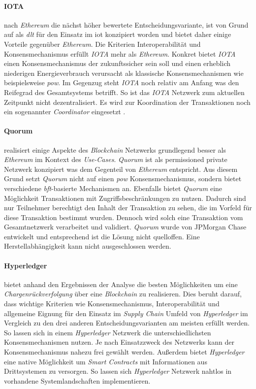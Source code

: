 \paragraph{IOTA} nach \textit{Ethereum} die nächst höher bewertete Entscheidungsvariante, ist von Grund auf als \textit{\ac{dlt}} für den Einsatz im \acf{iot} konzipiert worden und bietet daher einige Vorteile gegenüber \textit{Ethereum}. Die Kriterien Interoperabilität und Konsensmechanismus erfüllt \textit{IOTA} mehr als \textit{Ethereum}. Konkret bietet \textit{IOTA} einen Konsensmechanismus der zukunftssicher sein soll und einen erheblich niederigen Energieverbrauch verursacht als klassische Konsensmechanismen wie beispielsweise \textit{\ac{pow}}. Im Gegenzug steht \textit{IOTA} noch relativ am Anfang was den Reifegrad des Gesamtsystems betrifft. So ist das \textit{IOTA} Netzwerk zum aktuellen Zeitpunkt nicht dezentralisiert. Es wird zur Koordination der Transaktionen noch ein sogenannter \textit{Coordinator} eingesetzt \citep{Schiener2017}.

\paragraph{Quorum} realisiert einige Aspekte des \textit{Blockchain} Netzwerks grundlegend besser als \textit{Ethereum} im Kontext des \textit{Use-Cases}. \textit{Quorum} ist als permissioned private Netzwerk konzipiert was dem Gegenteil von \textit{Ethereum} entspricht. Aus diesem Grund setzt \textit{Quorum} nicht auf einen \textit{\ac{pow}} Konsensmechanismus, sondern bietet verschiedene \textit{\ac{bft}}-basierte Mechanismen an. Ebenfalls bietet \textit{Quorum} eine Möglichkeit Transaktionen mit Zugriffsbeschränkungen zu nutzen. Dadurch sind nur Teilnehmer berechtigt den Inhalt der Transaktion zu sehen, die im Vorfeld für diese Transaktion bestimmt wurden. Dennoch wird solch eine Transaktion vom Gesamtnetzwerk verarbeitet und validiert. \textit{Quorum} wurde von JPMorgan Chase entwickelt und entsprechend ist die Lösung nicht quelloffen. Eine Herstellabhängigkeit kann nicht ausgeschlossen werden.

\paragraph{Hyperledger} bietet anhand den Ergebnissen der Analyse die besten Möglichkeiten um eine \textit{Chargenrückverfolgung} über eine \textit{Blockchain} zu realisieren. Dies beruht darauf, dass wichtige Kriterien wie Konsensmechanismus, Interoperabilität und allgemeine Eignung für den Einsatz im \textit{Supply Chain} Umfeld von \textit{Hyperledger} im Vergleich zu den drei anderen Entscheidungsvarianten am meisten erfüllt werden. So lassen sich in einem \textit{Hyperledger} Netzwerk die unterschiedlichsten Konsensmechanismen nutzen. Je nach Einsatzzweck des Netzwerks kann der Konsensmechanismus nahezu frei gewählt werden. Außerdem bietet \textit{Hyperledger} eine native Möglichkeit um \textit{Smart Contracts} mit Informationen aus Drittsystemen zu versorgen. So lassen sich \textit{Hyperledger} Netzwerk nahtlos in vorhandene Systemlandschaften implementieren.\\

